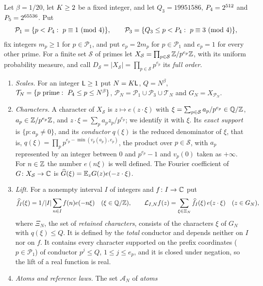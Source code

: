\begin{definition}\label{def:record:functional}
Let $\beta=1/20$, let $K\ge2$ be a fixed integer, and let $Q_3=19951586$,
$P_4=2^{512}$ and $P_5=2^{65536}$. Put
\[
 \mathcal P_1=\{p<\Pfour:\ p\equiv1\ (\mathrm{mod}\ 4)\},\qquad
 \mathcal P_3=\{Q_3\le p<\Pfour:\ p\equiv3\ (\mathrm{mod}\ 4)\},
\]
fix integers $m_p\ge1$ for $p\in\mathcal P_1$, and put $e_p=2m_p$ for
$p\in\mathcal P_1$ and $e_p=1$ for every other prime. For a finite set
$\mathcal S$ of primes let $X_{\mathcal S}=\prod_{p\in\mathcal S}\mathbb Z/p^{e_p}\mathbb Z$,
with its uniform probability measure, and call
$D_{\mathcal S}=|X_{\mathcal S}|=\prod_{p\in\mathcal S}p^{e_p}$ its \emph{full
order}.
\begin{enumerate}[label=(\alph*)]
\item \emph{Scales.} For an integer $\mathsf L\ge1$ put $N=K\mathsf L$, $Q=N^\beta$,
 $\mathcal T_N=\{p\ \text{prime}:\ P_4\le p\le N^\beta\}$,
 $\mathcal P_N=\mathcal P_1\cup\mathcal P_3\cup\mathcal T_N$ and
 $G_N=X_{\mathcal P_N}$.
\item \emph{Characters.} A character of $X_{\mathcal S}$ is
 $z\mapsto e(z\cdot\xi)$ with $\xi=\sum_{p\in\mathcal S}a_p/p^{e_p}\in\mathbb Q/\mathbb Z$,
 $a_p\in\mathbb Z/p^{e_p}\mathbb Z$, and $z\cdot\xi=\sum_pa_pz_p/p^{e_p}$; we identify it
 with $\xi$. Its \emph{exact support} is $\{p:a_p\ne0\}$, and its
 \emph{conductor} $q(\xi)$ is the reduced denominator of $\xi$, that is,
 $q(\xi)=\prod_pp^{e_p-\min(v_p(a_p),e_p)}$, the product over
 $p\in\mathcal S$, with $a_p$ represented by an integer between $0$ and
 $p^{e_p}-1$ and $v_p(0)$ taken as $+\infty$. For $n\in\mathbb Z$ the number
 $e(n\xi)$ is well defined. The Fourier coefficient of
 $G\colon X_{\mathcal S}\to\mathbb C$ is $\widehat G(\xi)=\mathbb E_zG(z)e(-z\cdot\xi)$.
\item \emph{Lift.} For a nonempty interval $I$ of integers and
 $f\colon I\to\mathbb C$ put
 \[
  \widehat f_I(\xi)=1/|I|\sum_{n\in I}f(n)e(-n\xi)\quad(\xi\in\mathbb Q/\mathbb Z),
  \qquad
  \mathcal L_{I,N}f(z)=\sum_{\xi\in\Xi_N}\widehat f_I(\xi)\,e(z\cdot\xi)\quad(z\in G_N),
 \]
 where $\Xi_N$, the set of \emph{retained characters}, consists of the
 characters $\xi$ of $G_N$ with $q(\xi)\le Q$. It is defined by the
 \emph{total} conductor and depends neither on $I$ nor on $f$. It contains
 every character supported on the prefix coordinates ($p\in\mathcal P_1$) of conductor $p^j\le Q$, $1\le j\le e_p$, and it is
 closed under negation, so the lift of a real function is real.
\item \emph{Atoms and reference laws.} The set $\mathcal A_N$ of \emph{atoms}

\end{enumerate}
\end{definition}
